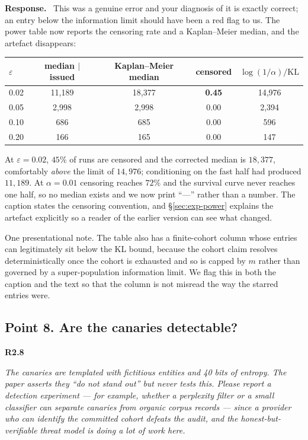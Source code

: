 \documentclass[11pt,a4paper]{article}
\newcommand{\eps}{\varepsilon}
\newenvironment{point}[1]{%
  \par\medskip\noindent\textbf{\color{rcol}#1}\par\nopagebreak\smallskip\begingroup
  \color{rcol}\itshape}{\endgroup\par}
\newenvironment{reply}{%
  \par\smallskip\noindent\textbf{\color{acol}Response.}\ \begingroup}{\endgroup\par}
\begin{document}
\begin{reply}
This was a genuine error and your diagnosis of it is exactly correct; an entry below
the information limit should have been a red flag to us. The power table now reports the
censoring rate and a Kaplan--Meier median, and the artefact disappears:

\begin{center}\small
\begin{tabular}{lcccc}
\toprule
$\eps$ & median $\mid$ issued & Kaplan--Meier median & censored & $\log(1/\alpha)/\mathrm{KL}$\\
\midrule
0.02 & 11{,}189 & 18{,}377 & \textbf{0.45} & 14{,}976\\
0.05 & 2{,}998  & 2{,}998  & 0.00 & 2{,}394\\
0.10 & 686      & 685      & 0.00 & 596\\
0.20 & 166      & 165      & 0.00 & 147\\
\bottomrule
\end{tabular}
\end{center}

At $\eps=0.02$, $45\%$ of runs are censored and the corrected median is $18{,}377$,
comfortably \emph{above} the limit of $14{,}976$; conditioning on the fast half had
produced $11{,}189$. At $\alpha=0.01$ censoring reaches $72\%$ and the survival curve
never reaches one half, so no median exists and we now print ``---'' rather than a
number. The caption states the censoring convention, and \S\ref{sec:exp-power} explains the artefact
explicitly so a reader of the earlier version can see what changed.

One presentational note. The table also has a finite-cohort column whose entries can
legitimately sit below the KL bound, because the cohort claim resolves deterministically
once the cohort is exhausted and so is capped by $m$ rather than governed by a
super-population information limit. We flag this in both the caption and the text so
that the column is not misread the way the starred entries were.
\end{reply}

\subsection*{Point 8. Are the canaries detectable?}

\begin{point}{R2.8}
The canaries are templated with fictitious entities and 40 bits of entropy. The paper
asserts they ``do not stand out'' but never tests this. Please report a detection
experiment --- for example, whether a perplexity filter or a small classifier can separate
canaries from organic corpus records --- since a provider who can identify the committed
cohort defeats the audit, and the honest-but-verifiable threat model is doing a lot of
work here.
\end{point}
\end{document}
